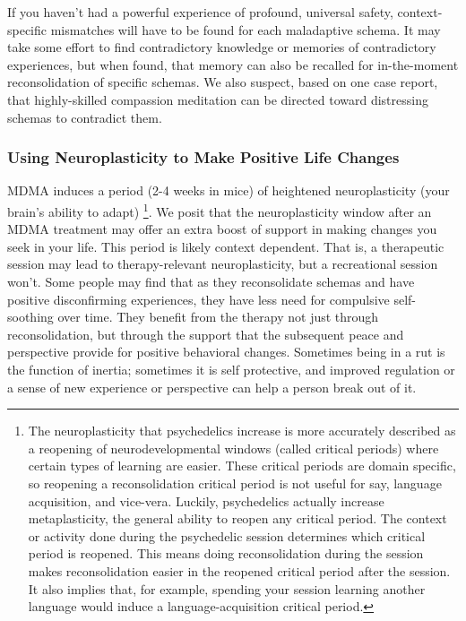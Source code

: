 \documentclass[12pt,letterpaper]{book}
\begin{document}
If you haven't had a powerful experience of profound, universal safety, context-specific mismatches will have to be found for each maladaptive schema.  It may take some effort to find contradictory knowledge or memories of contradictory experiences, but when found, that memory can also be recalled for in-the-moment reconsolidation of specific schemas. We also suspect, based on one case report, that highly-skilled compassion meditation can be directed toward distressing schemas to contradict them.

\subsubsection{Using Neuroplasticity to Make Positive Life Changes}
\label{sec:neuroplasticity}
MDMA induces a period (2-4 weeks in mice) of heightened neuroplasticity (your brain's ability to adapt) \cite{nardouMDMAPlasticity,nardouMDMAPlasticity} \footnote{The neuroplasticity that psychedelics increase is more accurately described as a reopening of neurodevelopmental windows (called critical periods) where certain types of learning are easier. These critical periods are domain specific, so reopening a reconsolidation critical period is not useful for say, language acquisition, and vice-vera. Luckily, psychedelics actually increase metaplasticity, the general ability to reopen any critical period. The context or activity done during the psychedelic session determines which critical period is reopened. This means doing reconsolidation during the session makes reconsolidation easier in the reopened critical period after the session. It also implies that, for example, spending your session learning another language would induce a language-acquisition critical period.}. We posit that the neuroplasticity window after an MDMA treatment may offer an extra boost of support in making changes you seek in your life. This period is likely context dependent. That is, a therapeutic session may lead to therapy-relevant neuroplasticity, but a recreational session won't. Some people may find that as they reconsolidate schemas and have positive disconfirming experiences, they have less need for compulsive self-soothing over time. They benefit from the therapy not just through reconsolidation, but through the support that the subsequent peace and perspective provide for positive behavioral changes. Sometimes being in a rut is the function of inertia; sometimes it is self protective, and improved regulation or a sense of new experience or perspective can help a person break out of it.
\end{document}
